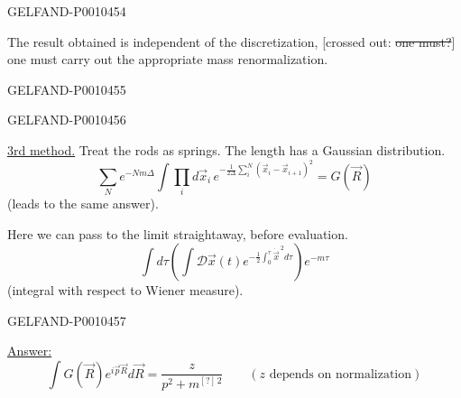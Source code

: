 \begin{GelfandAdjacentEvidence}{GELFAND-P001045}{4}


The result obtained is independent of the discretization,
[crossed out: \sout{one must?}]
one must carry out the appropriate mass renormalization.
\end{GelfandAdjacentEvidence}
\begin{GelfandAdjacentEvidence}{GELFAND-P001045}{5}

\end{GelfandAdjacentEvidence}
\begin{GelfandAdjacentEvidence}{GELFAND-P001045}{6}


\underline{3rd method.} Treat the rods as springs. The length has a Gaussian distribution.
\begin{equation*}
\sum_N e^{-Nm\Delta}\int\prod_i d\vec{x}_i\,
e^{-\frac{1}{2\Delta}\sum_i^N(\vec{x}_i-\vec{x}_{i+1})^2}=G(\vec{R})
\tag{22}
\end{equation*}
(leads to the same answer).

Here we can pass to the limit straightaway, before evaluation.
\begin{equation*}
\int d\tau\left(\int\mathcal{D}\vec{x}(t)
e^{-\frac12\int_0^\tau\dot{\vec{x}}^{\,2}d\tau}\right)e^{-m\tau}
\tag{23}
\end{equation*}
(integral with respect to Wiener measure).
\end{GelfandAdjacentEvidence}
\begin{GelfandAdjacentEvidence}{GELFAND-P001045}{7}


\underline{Answer:}
\begin{equation*}
\int G(\vec{R})e^{i\vec{p}\vec{R}}d\vec{R}=\frac{z}{p^2+m^{[?]\,2}}
\qquad(z\text{ depends on normalization})
\tag{24}
\end{equation*}
\end{GelfandAdjacentEvidence}

